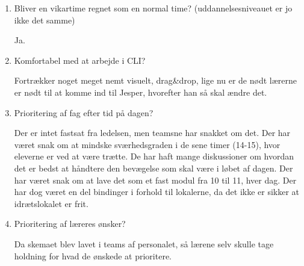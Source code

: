 \begin{enumerate}
	\item Bliver en vikartime regnet som en normal time? (uddannelsesniveauet er jo ikke det samme)
	
	Ja.
	
	\item Komfortabel med at arbejde i CLI?
	
	Fortrækker noget meget nemt visuelt, drag\&drop, lige nu er de nødt lærerne er nødt til at komme ind til Jesper, hvorefter han så skal ændre det.
	
	\item Prioritering af fag efter tid på dagen?
	
	Der er intet fastsat fra ledelsen, men teamsne har snakket om det. Der har været snak om at mindske sværhedsgraden i de sene timer (14-15), hvor eleverne er ved at være trætte. De har haft mange diskussioner om hvordan det er bedst at håndtere den bevægelse som skal være i løbet af dagen. Der har været snak om at lave det som et fast modul fra 10 til 11, hver dag. Der har dog været en del bindinger i forhold til lokalerne, da det ikke er sikker at idrætslokalet er frit.
	

	\item Prioritering af læreres ønsker?

	Da skemaet blev lavet i teams af personalet, så lærene selv skulle tage holdning for hvad de ønskede at prioritere.  
	
\end{enumerate}